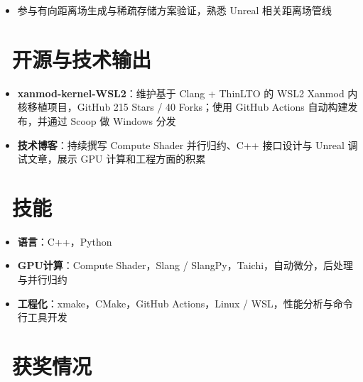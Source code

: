 \documentclass{resume}
\begin{document}
\begin{onehalfspacing}
\begin{itemize}
  \item 参与有向距离场生成与稀疏存储方案验证，熟悉 Unreal 相关距离场管线
\end{itemize}
\end{onehalfspacing}

\section{\faGithub\ 开源与技术输出}
\begin{itemize}[parsep=0.5ex]
  \item \textbf{xanmod-kernel-WSL2}：维护基于 Clang + ThinLTO 的 WSL2 Xanmod 内核移植项目，GitHub 215 Stars / 40 Forks；使用 GitHub Actions 自动构建发布，并通过 Scoop 做 Windows 分发
  \item \textbf{技术博客}：持续撰写 Compute Shader 并行归约、C++ 接口设计与 Unreal 调试文章，展示 GPU 计算和工程方面的积累
\end{itemize}

\section{\faCogs\ 技能}
\begin{itemize}[parsep=0.5ex]
  \item \textbf{语言}：C++，Python
  \item \textbf{GPU计算}：Compute Shader，Slang / SlangPy，Taichi，自动微分，后处理与并行归约
  \item \textbf{工程化}：xmake，CMake，GitHub Actions，Linux / WSL，性能分析与命令行工具开发
\end{itemize}

\section{\faHeartO\ 获奖情况}
\end{document}
